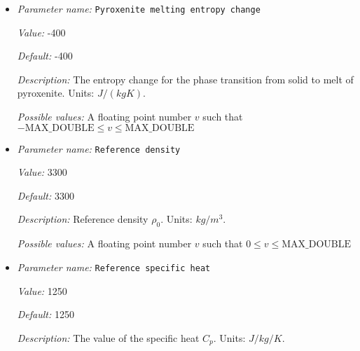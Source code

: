 \begin{itemize}
{\it Default:} -300


{\it Description:} The entropy change for the phase transition from solid to melt of peridotite. Units: $J/(kg K)$.


{\it Possible values:} A floating point number $v$ such that $-\text{MAX\_DOUBLE} \leq v \leq \text{MAX\_DOUBLE}$
\item {\it Parameter name:} {\tt Pyroxenite melting entropy change}
\label{parameters:Material model/Latent heat melt/Pyroxenite melting entropy change}
\label{parameters:Material_20model/Latent_20heat_20melt/Pyroxenite_20melting_20entropy_20change}


{\it Value:} -400


{\it Default:} -400


{\it Description:} The entropy change for the phase transition from solid to melt of pyroxenite. Units: $J/(kg K)$.


{\it Possible values:} A floating point number $v$ such that $-\text{MAX\_DOUBLE} \leq v \leq \text{MAX\_DOUBLE}$
\item {\it Parameter name:} {\tt Reference density}
\label{parameters:Material model/Latent heat melt/Reference density}
\label{parameters:Material_20model/Latent_20heat_20melt/Reference_20density}


{\it Value:} 3300


{\it Default:} 3300


{\it Description:} Reference density $\rho_0$. Units: $kg/m^3$.


{\it Possible values:} A floating point number $v$ such that $0 \leq v \leq \text{MAX\_DOUBLE}$
\item {\it Parameter name:} {\tt Reference specific heat}
\label{parameters:Material model/Latent heat melt/Reference specific heat}
\label{parameters:Material_20model/Latent_20heat_20melt/Reference_20specific_20heat}


{\it Value:} 1250


{\it Default:} 1250


{\it Description:} The value of the specific heat $C_p$. Units: $J/kg/K$.



\end{itemize}
